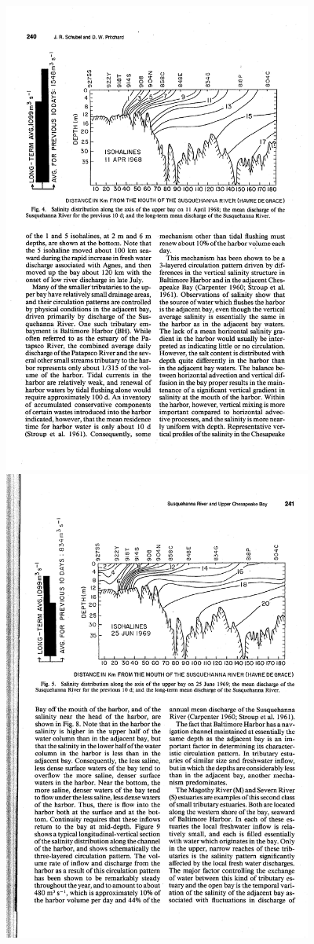 \begin{figure}[htb]
  \centering
  \includegraphics[width=4in]{figs/SchubelPritchard86Fig4}
  \includegraphics[width=4in]{figs/SchubelPritchard86Fig5}

\end{figure}
